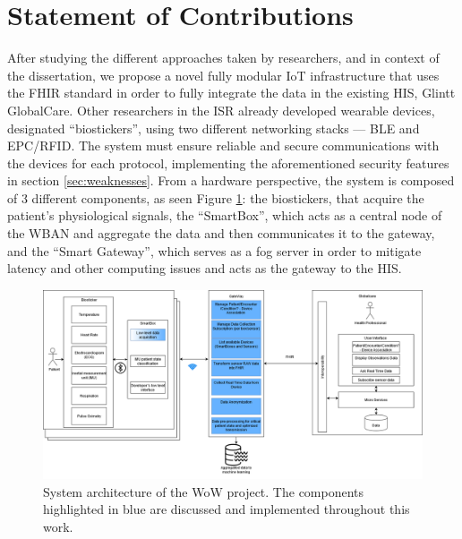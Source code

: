 

\section{Statement of Contributions}

After studying the different approaches taken by researchers, and in context of the dissertation, we propose a novel fully modular \acs{IoT} infrastructure that uses the \acs{FHIR} standard in order to fully integrate the data in the existing \acs{HIS}, Glintt GlobalCare. Other researchers in the \acf{ISR} already developed wearable devices, designated ``biostickers'', using two different networking stacks — \acs{BLE} and \acs{EPC/RFID}. The system must ensure reliable and secure communications with the devices for each protocol, implementing the aforementioned security features in section \ref{sec:weaknesses}. From a hardware perspective, the system is composed of 3 different components, as seen Figure \ref{fig:wow-architecture}: the biostickers, that acquire the patient's physiological signals, the ``SmartBox'', which acts as a central node of the WBAN and aggregate the data and then communicates it to the gateway, and the ``Smart Gateway'', which serves as a fog server in order to mitigate latency and other computing issues and acts as the gateway to the \acs{HIS}. 

\begin{figure}[H]
    \centering
    \includegraphics[width=\linewidth]{images/wow-architecture.png}
    \caption{System architecture of the \acs{WoW} project. The components highlighted in blue are discussed and implemented throughout this work.}
    \label{fig:wow-architecture}
\end{figure}

